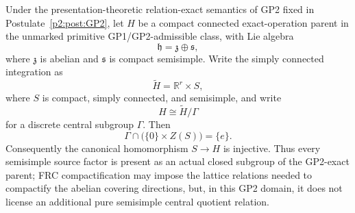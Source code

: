 \documentclass[12pt,a4paper]{article}
\begin{document}
\begin{lemma}
\label{p2:lem:no-gratuitous-semisimple-kernel}
Under the presentation-theoretic relation-exact semantics of GP2 fixed in
Postulate~\ref{p2:post:GP2}, let \(H\) be a compact connected
exact-operation parent in the unmarked primitive GP1/GP2-admissible class,
with Lie algebra
\[
        \mathfrak h=\mathfrak z\oplus\mathfrak s,
\]
where \(\mathfrak z\) is abelian and \(\mathfrak s\) is compact semisimple.
Write the simply connected integration as
\[
        \widetilde H=\mathbb R^r\times S,
\]
where \(S\) is compact, simply connected, and semisimple, and write
\[
        H\cong \widetilde H/\Gamma
\]
for a discrete central subgroup \(\Gamma\).  Then
\[
        \Gamma\cap\bigl(\{0\}\times Z(S)\bigr)=\{e\}.
\]
Consequently the canonical homomorphism \(S\to H\) is injective.  Thus every
semisimple source factor is present as an actual closed subgroup of the
GP2-exact parent; FRC compactification may impose the lattice relations needed
to compactify the abelian covering directions, but, in this GP2 domain, it
does not license an additional pure semisimple central quotient relation.
\end{lemma}
\end{document}
